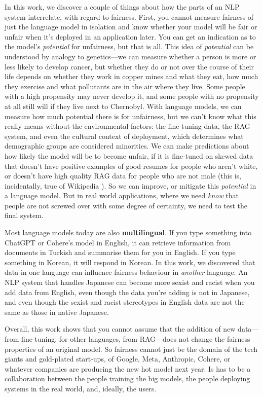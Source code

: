 \documentclass[phd,ilcc,oneside,leftchapter,parskip]{infthesis}
\begin{document}
\begin{preliminary}
\begin{laysummary}
In this work, we discover a couple of things about how the parts of an NLP system interrelate, with regard to fairness. First, you cannot measure fairness of just the language model in isolation and know whether your model will be fair or unfair when it's deployed in an application later. You can get an indication as to the model's \textit{potential} for unfairness, but that is all. This idea of \textit{potential} can be understood by analogy to genetics---we can measure whether a person is more or less likely to develop cancer, but whether they do or not over the course of their life depends on whether they work in copper mines and what they eat, how much they exercise and what pollutants are in the air where they live. Some people with a high propensity may never develop it, and some people with no propensity at all still will if they live next to Chernobyl. With language models, we can measure how much potential there is for unfairness, but we can't know what this really means without the environmental factors: the fine-tuning data, the RAG system, and even the cultural context of deployment, which determines what demographic groups are considered minorities. We can make predictions about how likely the model will be to become unfair, if it is fine-tuned on skewed data that doesn't have positive examples of good resumes for people who aren't white, or doesn't have high quality RAG data for people who are not male (this is, incidentally, true of Wikipedia \citep{sun-peng-2021-men}). So we can improve, or mitigate this \textit{potential} in a language model. But in real world applications, where we need \textit{know} that people are not screwed over with some degree of certainty, we need to test the final system.

Most language models today are also \textbf{multilingual}. If you type something into ChatGPT or Cohere's model in English, it can retrieve information from documents in Turkish and summarise them for you in English. If you type something in Korean, it will respond in Korean. In this work, we discovered that data in one language can influence fairness behaviour in \textit{another} language. An NLP system that handles Japanese can become more sexist and racist when you add data from English, even though the data you're adding is not in Japanese, and even though the sexist and racist stereotypes in English data are not the same as those in native Japanese. 

Overall, this work shows that you cannot assume that the addition of new data---from fine-tuning, for other languages, from RAG---does not change the fairness properties of an original model. So fairness cannot just be the domain of the tech giants and gold-plated start-ups, of Google, Meta, Anthropic, Cohere, or whatever companies are producing the new hot model next year. Is has to be a collaboration between the people training the big models, the people deploying systems in the real world, and, ideally, the users. 


\end{laysummary}
\end{preliminary}
\end{document}
